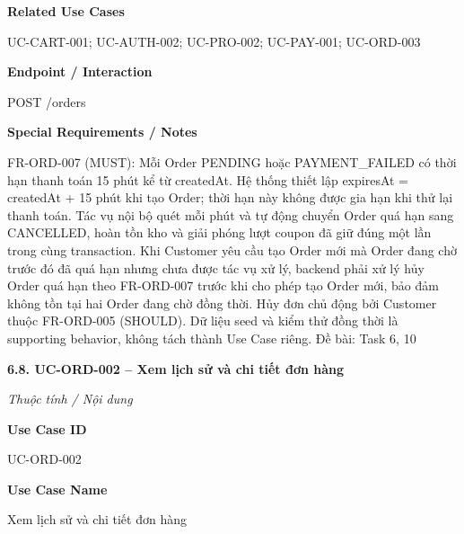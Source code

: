 \documentclass[11pt,a4paper,oneside]{report}
\begin{document}
\par\smallskip\noindent\textcolor{sgublue}{\textbf{Related Use Cases}}\par\nobreak
UC-CART-001; UC-AUTH-002; UC-PRO-002; UC-PAY-001; UC-ORD-003
\par

\par\smallskip\noindent\textcolor{sgublue}{\textbf{Endpoint / Interaction}}\par\nobreak
POST /orders
\par

\par\smallskip\noindent\textcolor{sgublue}{\textbf{Special Requirements / Notes}}\par\nobreak
FR-ORD-007 (MUST): Mỗi Order PENDING hoặc PAYMENT\_FAILED có thời hạn thanh toán 15 phút kể từ createdAt. Hệ thống thiết lập expiresAt = createdAt + 15 phút khi tạo Order; thời hạn này không được gia hạn khi thử lại thanh toán. Tác vụ nội bộ quét mỗi phút và tự động chuyển Order quá hạn sang CANCELLED, hoàn tồn kho và giải phóng lượt coupon đã giữ đúng một lần trong cùng transaction. Khi Customer yêu cầu tạo Order mới mà Order đang chờ trước đó đã quá hạn nhưng chưa được tác vụ xử lý, backend phải xử lý hủy Order quá hạn theo FR-ORD-007 trước khi cho phép tạo Order mới, bảo đảm không tồn tại hai Order đang chờ đồng thời. Hủy đơn chủ động bởi Customer thuộc FR-ORD-005 (SHOULD). Dữ liệu seed và kiểm thử đồng thời là supporting behavior, không tách thành Use Case riêng. \textbar{} Đề bài: Task 6, 10
\par



\textbf{6.8. UC-ORD-002 -- Xem lịch sử và chi tiết đơn hàng}



\par\noindent\textit{Thuộc tính / Nội dung}\par

\par\smallskip\noindent\textcolor{sgublue}{\textbf{Use Case ID}}\par\nobreak
UC-ORD-002
\par

\par\smallskip\noindent\textcolor{sgublue}{\textbf{Use Case Name}}\par\nobreak
Xem lịch sử và chi tiết đơn hàng
\par
\end{document}
